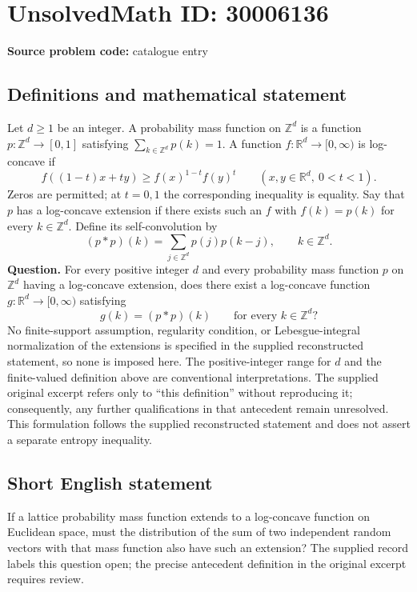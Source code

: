 \documentclass[11pt]{article}
\newcommand{\Z}{\mathbb{Z}}
\newcommand{\R}{\mathbb{R}}
\begin{document}
\section*{UnsolvedMath ID: 30006136}
\textbf{Source problem code:} catalogue entry
\subsection{Definitions and mathematical statement}
Let \(d\geq 1\) be an integer. A probability mass function on \(\Z^d\) is a function \(p:\Z^d\to[0,1]\) satisfying \(\sum_{k\in\Z^d}p(k)=1\). A function \(f:\R^d\to[0,\infty)\) is log-concave if
\[
f((1-t)x+ty)\geq f(x)^{1-t}f(y)^t
\qquad(x,y\in\R^d,\ 0<t<1).
\]
Zeros are permitted; at \(t=0,1\) the corresponding inequality is equality. Say that \(p\) has a log-concave extension if there exists such an \(f\) with \(f(k)=p(k)\) for every \(k\in\Z^d\). Define its self-convolution by
\[
(p*p)(k)=\sum_{j\in\Z^d}p(j)p(k-j),\qquad k\in\Z^d.
\]
\textbf{Question.} For every positive integer \(d\) and every probability mass function \(p\) on \(\Z^d\) having a log-concave extension, does there exist a log-concave function \(g:\R^d\to[0,\infty)\) satisfying
\[
g(k)=(p*p)(k)\qquad\text{for every }k\in\Z^d?
\]
No finite-support assumption, regularity condition, or Lebesgue-integral normalization of the extensions is specified in the supplied reconstructed statement, so none is imposed here. The positive-integer range for \(d\) and the finite-valued definition above are conventional interpretations. The supplied original excerpt refers only to ``this definition'' without reproducing it; consequently, any further qualifications in that antecedent remain unresolved. This formulation follows the supplied reconstructed statement and does not assert a separate entropy inequality.
\subsection{Short English statement}
If a lattice probability mass function extends to a log-concave function on Euclidean space, must the distribution of the sum of two independent random vectors with that mass function also have such an extension? The supplied record labels this question open; the precise antecedent definition in the original excerpt requires review.
\end{document}
